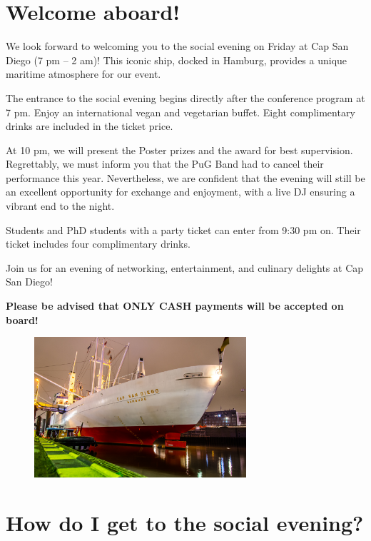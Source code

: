 
\setlength{\parskip}{1em}   

\section*{Welcome aboard!}

We look forward to welcoming you to the social evening on Friday at Cap San Diego (7 pm – 2 am)! This iconic ship, docked in Hamburg, provides a unique maritime atmosphere for our event.

The entrance to the social evening begins directly after the conference program at 7 pm. Enjoy an international vegan and vegetarian buffet. Eight complimentary drinks are included in the ticket price.

At 10 pm, we will present the Poster prizes and the award for best supervision. Regrettably, we must inform you that the PuG Band had to cancel their performance this year. Nevertheless, we are confident that the evening will still be an excellent opportunity for exchange and enjoyment, with a live DJ ensuring a vibrant end to the night.

Students and PhD students with a party ticket can enter from 9:30 pm on. Their ticket includes four complimentary drinks.

Join us for an evening of networking, entertainment, and culinary delights at Cap San Diego! 

\textbf{Please be advised that ONLY CASH payments will be accepted on board!}

\vspace*{1cm}

\begin{figure}[H]
	\centering
	\includegraphics[width=0.7\textwidth]{tex/images/social_event/social4.png}
\end{figure}

\newpage

\section*{How do I get to the social evening?}

